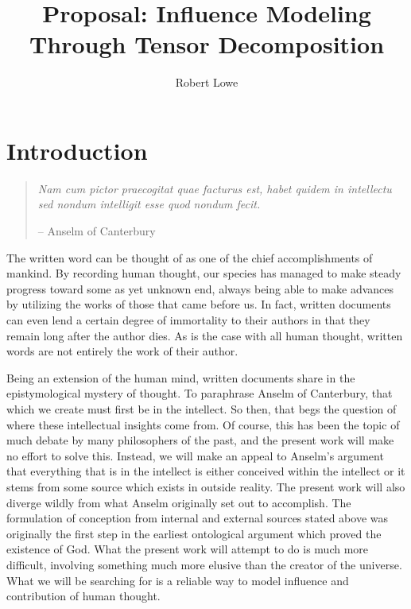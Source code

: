 \documentclass{article}
\title{Proposal: Influence Modeling Through Tensor Decomposition}
\author{Robert Lowe}
\begin{document}
\maketitle

\section{Introduction}
\begin{quote}
\textit{Nam cum pictor praecogitat quae facturus est, habet quidem in intellectu sed nondum intelligit esse quod nondum fecit.}

-- Anselm of Canterbury~\cite{anselm}
\end{quote}

The written word can be thought of as one of the chief accomplishments
of mankind.  By recording human thought, our species has managed to
make steady progress toward some as yet unknown end, always being able
to make advances by utilizing the works of those that came before us.
In fact, written documents can even lend a certain degree of
immortality to their authors in that they remain long after the author
dies.  As is the case with all human thought, written words are not
entirely the work of their author.

Being an extension of the human mind, written documents share in the
epistymological mystery of thought.  To paraphrase Anselm of
Canterbury, that which we create must first be in the intellect.  So
then, that begs the question of where these intellectual insights come
from.  Of course, this has been the topic of much debate by many
philosophers of the past, and the present work will make no effort to
solve this.  Instead, we will make an appeal to Anselm's argument that
everything that is in the intellect is either conceived within the
intellect or it stems from some source which exists in outside
reality.  The present work will also diverge wildly from what Anselm
originally set out to accomplish.  The formulation of conception from
internal and external sources stated above was originally the first
step in the earliest ontological argument which proved the existence
of God.  What the present work will attempt to do is much more
difficult, involving something much more elusive than the creator of
the universe.  What we will be searching for is a reliable way to
model influence and contribution of human thought.
\end{document}
